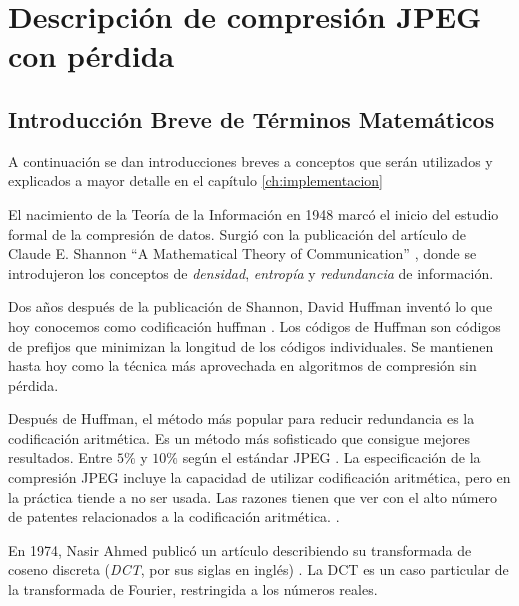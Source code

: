 \chapter{Descripción de compresión JPEG con pérdida}\label{ch:jpeg_desc}

\section{Introducción Breve de Términos Matemáticos}

A continuación se dan introducciones breves a conceptos que serán utilizados y
explicados a mayor detalle en el capítulo \ref{ch:implementacion}

El nacimiento de la Teoría de la Información en 1948 marcó el inicio del
estudio formal de la compresión de datos. Surgió con la publicación del
artículo de Claude E.  Shannon ``A Mathematical Theory of Communication''
\cite{shannon}, donde se introdujeron los conceptos de \emph{densidad},
\emph{entropía} y \emph{redundancia} de información.


Dos años después de la publicación de Shannon, David Huffman inventó lo que hoy
conocemos como codificación huffman \cite{Huffman}. Los \gls{códigos de Huffman} son
códigos de prefijos que minimizan la longitud de los códigos individuales. Se
mantienen hasta hoy como la técnica más aprovechada en algoritmos de compresión
sin pérdida.

Después de Huffman, el método más popular para reducir redundancia es la
\gls{codificación aritmética}. Es un método más sofisticado que consigue
mejores resultados. Entre $5\%$ y $10\%$ según el estándar JPEG
\cite{jpeg-spec}. La especificación de la compresión JPEG incluye la capacidad
de utilizar codificación aritmética, pero en la práctica tiende a no ser usada.
Las razones tienen que ver con el alto número de patentes relacionados a la
codificación aritmética. \cite{jpeg_patents}.

En 1974, Nasir Ahmed publicó un artículo describiendo su transformada de coseno
discreta (\emph{DCT}, por sus siglas en inglés) \cite{ahmed_dct}. La \gls{DCT} es un
caso particular de la transformada de Fourier, restringida a los números
reales.

